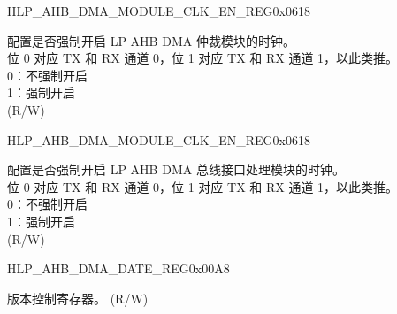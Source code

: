 \begin{register}{H}{LP\_AHB\_DMA\_MODULE\_CLK\_EN\_REG}{0x0618}
\begin{regdesc}
\begin{reglist}
\label{fielddesc:LPAHBDMACMDARBCLKEN}\item [LP\_AHB\_DMA\_CMD\_ARB\_CLK\_EN] 配置是否强制开启 LP AHB DMA 仲裁模块的时钟。\\位 0 对应 TX 和 RX 通道 0，位 1 对应 TX 和 RX 通道 1，以此类推。\\0：不强制开启\\1：强制开启\\ (R/W)
\item [见下页...]
\end{reglist}\end{regdesc}
\end{register}

\addtocounter{Regfloat}{-1}
\begin{register}{H}{LP\_AHB\_DMA\_MODULE\_CLK\_EN\_REG}{0x0618}
\begin{regdesc}\begin{reglist}
\item [接上页...]
\label{fielddesc:LPAHBDMAAHBINFCLKEN}\item [LP\_AHB\_DMA\_AHBINF\_CLK\_EN] 配置是否强制开启 LP AHB DMA 总线接口处理模块的时钟。\\位 0 对应 TX 和 RX 通道 0，位 1 对应 TX 和 RX 通道 1，以此类推。\\0：不强制开启\\1：强制开启\\ (R/W)
\end{reglist}\end{regdesc}
\end{register}


\begin{register}{H}{LP\_AHB\_DMA\_DATE\_REG}{0x00A8}\label{regdesc:LPAHBDMADATEREG}
%
\regnewline%
\begin{regdesc}\begin{reglist}
\label{fielddesc:LPAHBDMADATE}\item [LP\_AHB\_DMA\_DATE] 版本控制寄存器。 (R/W)
\end{reglist}\end{regdesc}
\end{register}


